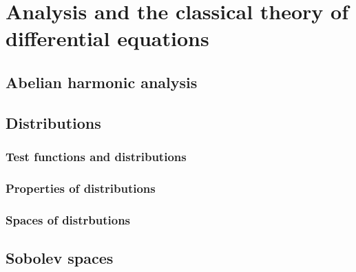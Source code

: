 \chapter{Analysis and the classical theory of differential equations}
    \begin{abstract}
        
    \end{abstract}
    
    \section{Abelian harmonic analysis}
    
    \section{Distributions}
        \subsection{Test functions and distributions}
        
        \subsection{Properties of distributions}
        
        \subsection{Spaces of distrbutions}
    
    \section{Sobolev spaces}
